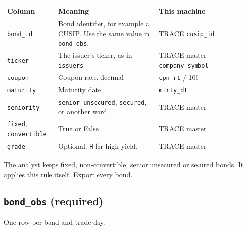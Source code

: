 \documentclass[10.5pt,a4paper]{article}
\newcommand{\code}[1]{\texttt{\small #1}}
\begin{document}
\begin{longtable}{@{}>{\raggedright\arraybackslash}p{0.198\linewidth}>{\raggedright\arraybackslash}p{0.405\linewidth}>{\raggedright\arraybackslash}p{0.297\linewidth}@{}}
\toprule
\textbf{Column} & \textbf{Meaning} & \textbf{This machine}\\
\midrule
\endhead
\code{bond\_\allowbreak{}id} & Bond identifier, for example a CUSIP. Use the same value in \code{bond\_\allowbreak{}obs}. & TRACE \code{cusip\_\allowbreak{}id}\\
\code{ticker} & The issuer's ticker, as in \code{issuers} & TRACE master \code{company\_\allowbreak{}symbol}\\
\code{coupon} & Coupon rate, decimal & \code{cpn\_\allowbreak{}rt} / 100\\
\code{maturity} & Maturity date & \code{mtrty\_\allowbreak{}dt}\\
\code{seniority} & \code{senior\_\allowbreak{}unsecured}, \code{secured}, or another word & TRACE master\\
\code{fixed}, \code{convertible} & True or False & TRACE master\\
\code{grade} & Optional. \code{H} for high yield. & TRACE master\\
\bottomrule
\end{longtable}

The analyst keeps fixed, non-convertible, senior unsecured or secured bonds. It applies this rule itself. Export every bond.

\subsection{\code{bond\_\allowbreak{}obs} (required)}

One row per bond and trade day.
\end{document}
